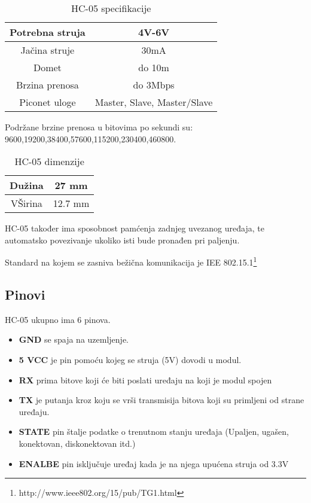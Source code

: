 \documentclass[../Document.tex]{subfiles}
\begin{document}
\vspace{1cm}
\begin{table}[h]
    \centering
    \begin{tabular}{ |c|c| }
        \hline
        Potrebna struja & 4V-6V                       \\
        \hline
        Jačina struje   & 30mA                        \\
        \hline
        Domet           & do 10m                      \\
        \hline
        Brzina prenosa  & do 3Mbps                    \\
        \hline
        Piconet uloge   & Master, Slave, Master/Slave \\
        \hline
    \end{tabular}
    \caption{HC-05 specifikacije}
\end{table}

\noindent Podržane brzine prenosa u bitovima po sekundi su: 9600,19200,38400,57600,115200,230400,460800. \\


\begin{table}[h!]
    \centering
    \begin{tabular}{ |c|c| }
        \hline
        Dužina  & 27 mm   \\
        \hline
        VŠirina & 12.7 mm \\
        \hline
    \end{tabular}
    \caption{HC-05 dimenzije}
\end{table}

\noindent HC-05 također ima sposobnost pamćenja zadnjeg uvezanog uređaja, te automatsko povezivanje ukoliko isti bude pronađen pri paljenju.

\noindent Standard na kojem se zasniva bežična komunikacija je IEE 802.15.1\footnote{http://www.ieee802.org/15/pub/TG1.html}

\subsection{Pinovi}
HC-05 ukupno ima 6 pinova.
\begin{itemize}
    \item\textbf{GND} se spaja na uzemljenje.
    \item\textbf{5 VCC} je pin pomoću kojeg se struja (5V) dovodi u modul.
    \item\textbf{RX} prima bitove koji će biti poslati uređaju na koji je modul spojen
    \item\textbf{TX} je putanja kroz koju se vrši transmisija bitova koji su primljeni od strane uređaju.
    \item\textbf{STATE} pin štalje podatke o trenutnom stanju uređaja (Upaljen, ugašen, konektovan, diskonektovan itd.)
    \item\textbf{ENALBE} pin isključuje uređaj kada je na njega upućena struja od 3.3V
\end{itemize}
\newpage
\end{document}
